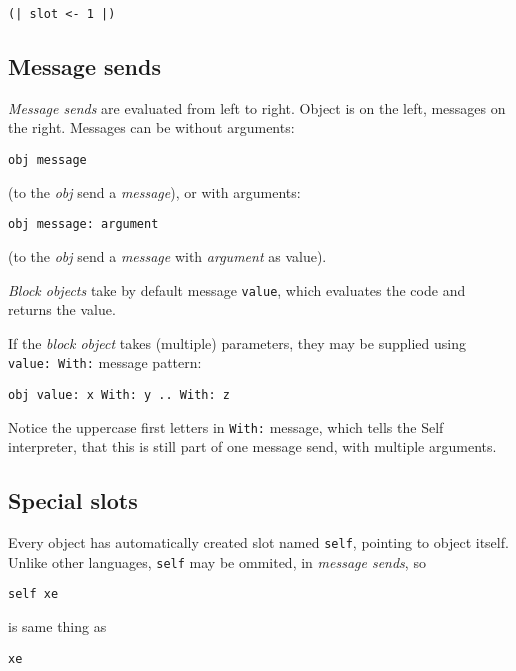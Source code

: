 \documentclass[10pt]{article}
\begin{document}
\begin{multicols*}{3}
\begin{lstlisting}
(| slot <- 1 |)
\end{lstlisting}




\subsection{Message sends}

\textit{Message sends} are evaluated from left to right. Object is on the left, messages on the right. Messages can be without arguments:

\begin{lstlisting}
obj message
\end{lstlisting}

(to the \textit{obj} send a \textit{message}), or with arguments:

\begin{lstlisting}
obj message: argument
\end{lstlisting}

(to the \textit{obj} send a \textit{message} with \textit{argument} as value).

\textit{Block objects} take by default message \texttt{value}, which evaluates the code and returns the value.

If the \textit{block object} takes (multiple) parameters, they may be supplied using \texttt{value:\ With:} message pattern:

\begin{lstlisting}
obj value: x With: y .. With: z
\end{lstlisting}

Notice the uppercase first letters in \texttt{With:} message, which tells the Self interpreter, that this is still part of one message send, with multiple arguments.




\subsection{Special slots}
Every object has automatically created slot named \texttt{self}, pointing to object itself. Unlike other languages, \texttt{self} may be ommited, in \textit{message sends}, so

\begin{lstlisting}
self xe
\end{lstlisting}

is same thing as

\begin{lstlisting}
xe
\end{lstlisting}


\end{multicols*}
\end{document}
